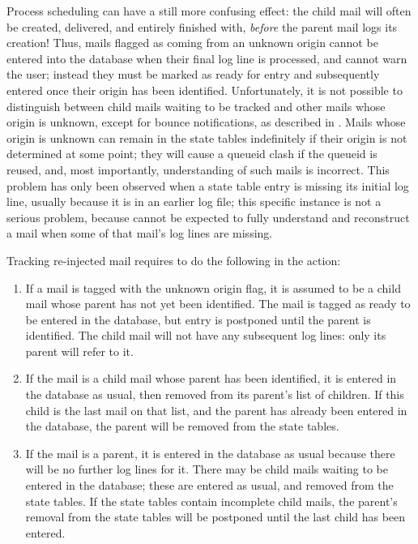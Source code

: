 Process scheduling can have a still more confusing effect: the child mail
will often be created, delivered, and entirely finished with,
\textit{before\/} the parent mail logs its creation!  Thus, mails flagged
as coming from an unknown origin cannot be entered into the database when
their final log line is processed, and \parsername{} cannot warn the user;
instead they must be marked as ready for entry and subsequently entered
once their origin has been identified.  Unfortunately, it is not possible
to distinguish between child mails waiting to be tracked and other mails
whose origin is unknown, except for bounce notifications, as described in
.  Mails whose origin is
unknown can remain in the state tables indefinitely if their origin is not
determined at some point; they will cause a queueid clash if the queueid is
reused, and, most importantly, \parsernames{} understanding of such mails
is incorrect.  This problem has only been observed when a state table entry
is missing its initial log line, usually because it is in an earlier log
file; this specific instance is not a serious problem, because
\parsername{} cannot be expected to fully understand and reconstruct a mail
when some of that mail's log lines are missing.

Tracking re-injected mail requires \parsername{} to do the following in the
 action:

\begin{enumerate}

    \item If a mail is tagged with the unknown origin flag, it is assumed
        to be a child mail whose parent has not yet been identified.  The
        mail is tagged as ready to be entered in the database, but entry is
        postponed until the parent is identified.  The child mail will not
        have any subsequent log lines: only its parent will refer to it.

    \item If the mail is a child mail whose parent has been identified, it
        is entered in the database as usual, then removed from its parent's
        list of children.  If this child is the last mail on that list, and
        the parent has already been entered in the database, the parent
        will be removed from the state tables.

    \item If the mail is a parent, it is entered in the database as usual
        because there will be no further log lines for it.  There may be
        child mails waiting to be entered in the database; these are
        entered as usual, and removed from the state tables.  If the state
        tables contain incomplete child mails, the parent's removal from
        the state tables will be postponed until the last child has been
        entered.

\end{enumerate}

